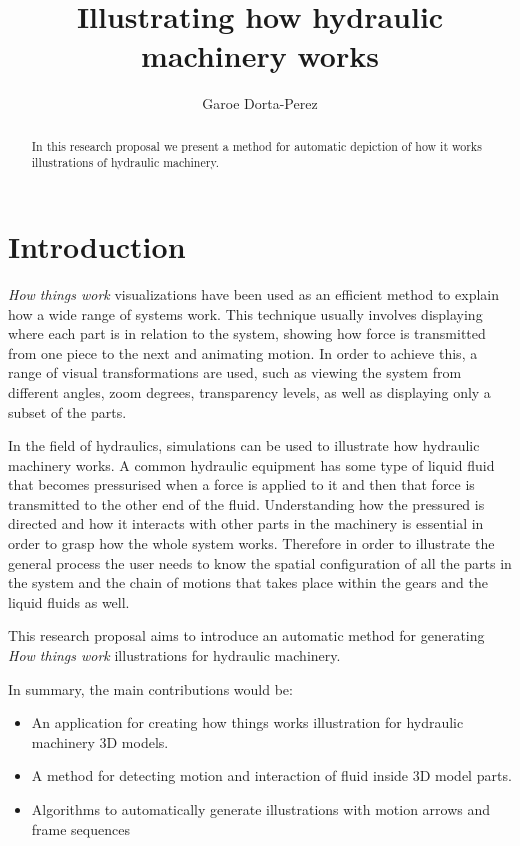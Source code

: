 \documentclass[11pt]{report}
\title{ Illustrating how hydraulic machinery works } \author{Garoe Dorta-Perez}
\begin{document}
\maketitle
\begin{abstract}
In this research proposal we present a method for automatic depiction of how it works illustrations of hydraulic machinery. \end{abstract}


\chapter{Introduction}
\label{ch:intro}

\textit{How things work} visualizations have been used as an efficient method to explain how a wide range of systems work. 
This technique usually involves displaying where each part is in relation to the system, showing how force is transmitted from one piece to the next and animating motion. 
In order to achieve this, a range of visual transformations are used, such as viewing the system from different angles, zoom degrees,  transparency levels, as well as displaying only a subset of the parts.

In the field of hydraulics, simulations can be used to illustrate how hydraulic machinery works.
A common hydraulic equipment has  some type of liquid fluid that becomes pressurised when a force is applied to it and then that force is transmitted to the other end of the fluid. 
Understanding how the pressured is directed and how it interacts with other parts in the machinery is essential in order to grasp how the whole system works. 
Therefore in order to illustrate the general process the user needs to know the spatial configuration of all the parts in the system and the chain of motions that takes place within the gears and the liquid fluids as well.

This research proposal aims to introduce an automatic method for generating \textit{How things work} illustrations for hydraulic machinery. 

In summary, the main contributions would be:
\begin{itemize}
\item An application for creating how things works illustration for hydraulic machinery 3D models.
\item A method for detecting motion and interaction of fluid inside 3D model parts.
\item Algorithms to automatically generate illustrations with motion arrows and frame sequences
\end{itemize}
\end{document}
